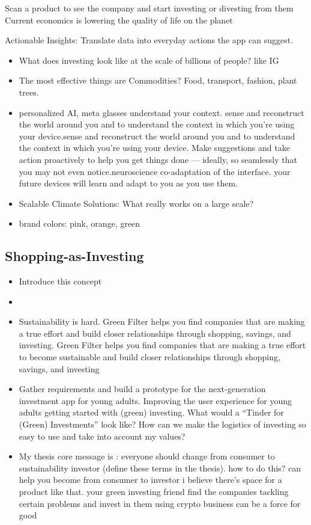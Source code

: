 \documentclass[
  letterpaper,
  DIV=11,
  numbers=noendperiod]{scrartcl}
\providecommand{\tightlist}{%
  \setlength{\itemsep}{0pt}\setlength{\parskip}{0pt}}\usepackage{longtable,booktabs,array}
\begin{document}
Scan a product to see the company and start investing or divesting from
them Current economics is lowering the quality of life on the planet

Actionable Insights: Translate data into everyday actions the app can
suggest.

\begin{itemize}
\tightlist
\item
  What does investing look like at the scale of billions of people? like
  IG
\item
  The most effective things are Commodities? Food, transport, fashion,
  plant trees.
\item
  personalized AI, meta glasses understand your context. sense and
  reconstruct the world around you and to understand the context in
  which you're using your device.sense and reconstruct the world around
  you and to understand the context in which you're using your device.
  Make suggestions and take action proactively to help you get things
  done --- ideally, so seamlessly that you may not even
  notice.neuroscience co-adaptation of the interface. your future
  devices will learn and adapt to you as you use them.
\item
  Scalable Climate Solutions: What really works on a large scale?
\item
  brand colors: pink, orange, green
\end{itemize}

\subsection{Shopping-as-Investing}\label{shopping-as-investing}

\begin{itemize}
\item
  Introduce this concept
\item
  \citet{themanorSustainabilityNotSacrifice2022}
\item
  Sustainability is hard. Green Filter helps you find companies that are
  making a true effort and build closer relationships through shopping,
  savings, and investing. Green Filter helps you find companies that are
  making a true effort to become sustainable and build closer
  relationships through shopping, savings, and investing
\item
  Gather requirements and build a prototype for the next-generation
  investment app for young adults. Improving the user experience for
  young adults getting started with (green) investing. What would a
  ``Tinder for (Green) Investments'' look like? How can we make the
  logistics of investing so easy to use and take into account my values?
\item
  My thesis core message is : everyone should change from consumer to
  sustainability investor (define these terms in the thesis). how to do
  this? can help you become from consumer to investor i believe there's
  space for a product like that. your green investing friend find the
  companies tackling certain problems and invest in them using crypto
  business can be a force for good
\end{itemize}
\end{document}

